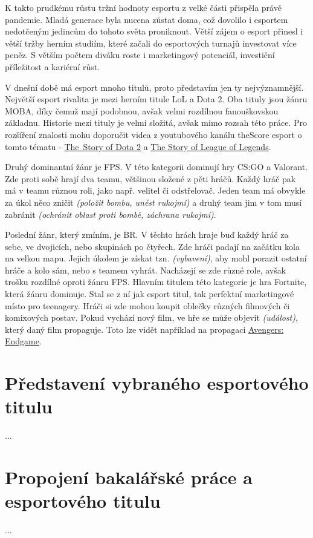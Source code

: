 K takto prudkému růstu tržní hodnoty esportu z velké části přispěla právě pandemie. Mladá generace byla nucena zůstat doma, což dovolilo i esportem nedotčeným jedincům do
tohoto světa proniknout. Větší zájem o esport přinesl i větší tržby herním studiím, které začali do esportových turnajů investovat více peněz\cite{Professeur2021}\cite{liquipedia2021}.
S větším počtem diváku roste i marketingový potenciál, investiční příležitost a kariérní růst.

V dnešní době má esport mnoho titulů, proto představím jen ty nejvýznamnější. Největší esport rivalita je mezi herním titule \ac{LoL} a Dota 2. Oba tituly jsou žánru \ac{MOBA}, díky 
čemuž mají podobnou, avšak velmi rozdílnou fanouškovskou základnu. Historie mezi tituly je velmi složitá, avšak mimo rozsah této práce. Pro rozšíření znalosti mohu doporučit videa 
z youtubového kanálu theScore esport o tomto tématu - \href{https://www.youtube.com/watch?v=h9Zv_TiVzmg}{The~Story of Dota 2} a \href{https://www.youtube.com/watch?v=tHtfD-MnQK8}{The Story of League of Legends}.

Druhý dominantní žánr je \ac{FPS}. V této kategorii dominují hry \ac{CS:GO} a Valorant. Zde proti sobě hrají dva teamu, většinou složené z pěti hráčů. Každý hráč pak má v teamu různou roli, jako např. velitel
či odstřelovač. Jeden team má obvykle za úkol něco zničit \textit{(položit bombu, unést rukojmí)} a druhý team jim v tom musí zabránit \textit{(ochránit oblast proti bombě, záchrana rukojmí)}.

Poslední žánr, který zmíním, je \ac{BR}. V těchto hrách hraje buď každý hráč za sebe, ve dvojicích, nebo skupinách po čtyřech. Zde hráči padají na začátku kola na velkou mapu. Jejich úkolem je
získat tzn.  \textit{(vybavení)}, aby mohl porazit ostatní hráče a kolo sám, nebo s teamem vyhrát. Nacházejí se zde různé role, avšak trošku rozdílné oproti žánru \ac{FPS}. Hlavním titulem
této kategorie je hra Fortnite, která žánru dominuje. Stal se z ní jak esport titul, tak perfektní marketingové místo pro teenagery. Hráči si zde mohou koupit oblečky různých filmových či komixových postav.
Pokud vychází nový film, ve hře se může objevit  \textit{(událost)}, který daný film propaguje. Toto lze vidět například na propagaci \href{https://www.youtube.com/watch?v=TanGK9o_d24}{Avengers: Endgame}.
\section{Představení vybraného esportového titulu}
...

\section{Propojení bakalářské práce a esportového titulu}
...

